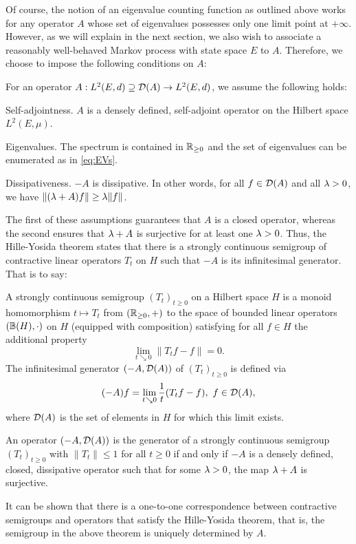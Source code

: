 Of course, the notion of an eigenvalue counting function as outlined above works for any operator $A$ whose set of eigenvalues possesses only one limit point at $+\infty$. However, as we will explain in the next section, we also wish to associate a reasonably well-behaved Markov process with state space $E$ to $A$. Therefore, we choose to impose the following conditions on $A$:
\begin{cond}\label{cond:A}
For an operator $A:L^2(E,d)\supseteq\mathcal{D}(A)\to L^2(E,d)$, we assume the following holds:
\begin{compactdesc}
  \item[Self-adjointness.] $A$ is a densely defined, self-adjoint operator on the Hilbert space $L^2(E,\mu)$.
  \item[Eigenvalues.] The spectrum is contained in $\mathbb{R}_{\geq0}$ and the set of eigenvalues can be enumerated as in \eqref{eq:EVs}.
  \item[Dissipativeness.] $-A$ is dissipative. In other words, for all $f\in\mathcal{D}(A)$ and all $\lambda>0$, we have 
  $\|(\lambda+A)f\|\geq\lambda\|f\|$.
\end{compactdesc}
\end{cond}
The first of these assumptions guarantees that $A$ is a closed operator, whereas the second ensures that $\lambda+A$ is surjective for at least one $\lambda>0$. Thus, the Hille-Yosida theorem states that there is a strongly continuous semigroup of contractive linear operators $T_t$ on $H$ such that $-A$ is its infinitesimal generator. That is to say:
\begin{defin}\label{def:semigroup}
  A strongly continuous semigroup $(T_t)_{t\geq0}$ on a Hilbert space $H$ is a monoid homomorphism $t\mapsto T_t$ from $(\mathbb{R}_{\geq0},+)$ to the space of bounded linear operators $(\mathbb{B}(H),\cdot)$ on $H$ (equipped with composition) satisfying for all $f\in H$ the additional property
  \[
    \lim_{t\searrow0} \|T_tf-f\|=0.
  \]
  The infinitesimal generator $(-A,\mathcal{D}(A))$ of $(T_t)_{t\geq0}$ is defined via
  \[
    (-A)f=\lim_{t\searrow0}\frac{1}{t}(T_tf-f),\ f\in\cD(A),
  \]
  where $\mathcal{D}(A)$ is the set of elements in $H$ for which this limit exists.
\end{defin}
\begin{thm}\label{thm:HY}
  An operator $(-A,\mathcal{D}(A))$ is the generator of a strongly continuous semigroup $(T_t)_{t\geq0}$ with $\|T_t\|\leq1$ for all $t\geq0$ if and only if $-A$ is a densely defined, closed, dissipative operator such that for some $\lambda>0$, the map $\lambda+A$ is surjective. 
\end{thm}
It can be shown that there is a one-to-one correspondence between contractive semigroups and operators that satisfy the Hille-Yosida theorem, that is, the semigroup in the above theorem is uniquely determined by $A$. 

